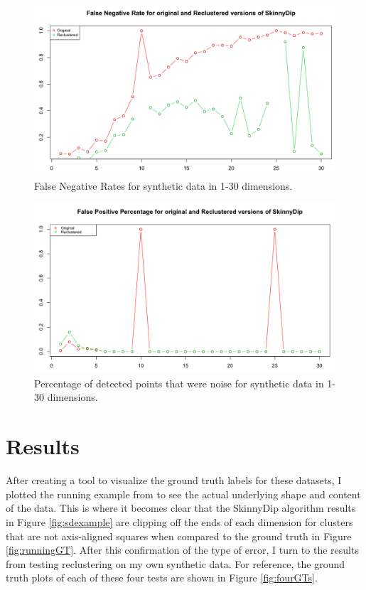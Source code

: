 \documentclass{sig-alternate-05-2015}
\begin{document}
\begin{figure}[t]
\centering
\includegraphics[width=\textwidth]{images/falsenegmd}
\caption{False Negative Rates for synthetic data in 1-30 dimensions.}
\label{fig:falsenegmd}
\end{figure}

\begin{figure}[t]
\centering
\includegraphics[width=\textwidth]{images/falseposmd}
\caption{Percentage of detected points that were noise for synthetic data in 1-30 dimensions.}
\label{fig:falseposmd}
\end{figure}


\section{Results} \label{results}
After creating a tool to visualize the ground truth labels for these datasets, I plotted the running example from \cite{skinnydip} to see the actual underlying shape and content of the data. This is where it becomes clear that the SkinnyDip algorithm results in Figure \ref{fig:sdexample} are clipping off the ends of each dimension for clusters that are not axis-aligned squares when compared to the ground truth in Figure \ref{fig:runningGT}. After this confirmation of the type of error, I turn to the results from testing reclustering on my own synthetic data. For reference, the ground truth plots of each of these four tests are shown in Figure \ref{fig:fourGTs}.
\end{document}
